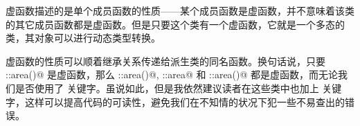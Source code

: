 虚函数描述的是单个成员函数的性质——某个成员函数是虚函数，并不意味着该类的其它成员函数都是虚函数。但是只要这个类有一个虚函数，它就是一个多态的类，其对象可以进行动态类型转换。\par
虚函数的性质可以顺着继承关系传递给派生类的同名函数。换句话说，只要 \lstinline@Shape::area()@ 是虚函数，那么 \lstinline@Triangle::area()@, \lstinline@Circle::area@ 和 \lstinline@Parallelogram::area()@ 都是虚函数，而无论我们是否使用了 \lstinline@virtual@ 关键字。虽说如此，但是我依然建议读者在这些类中也加上 \lstinline@virtual@ 关键字，这样可以提高代码的可读性，避免我们在不知情的状况下犯一些不易查出的错误。\par
